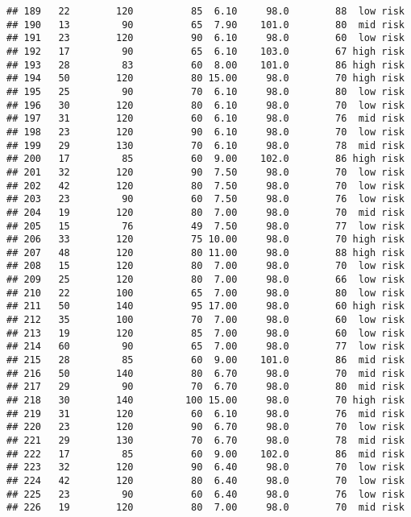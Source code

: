 \documentclass[
  ignorenonframetext,
]{beamer}
\begin{document}
\begin{frame}[fragile]
\begin{verbatim}
## 189   22        120          85  6.10     98.0        88  low risk
## 190   13         90          65  7.90    101.0        80  mid risk
## 191   23        120          90  6.10     98.0        60  low risk
## 192   17         90          65  6.10    103.0        67 high risk
## 193   28         83          60  8.00    101.0        86 high risk
## 194   50        120          80 15.00     98.0        70 high risk
## 195   25         90          70  6.10     98.0        80  low risk
## 196   30        120          80  6.10     98.0        70  low risk
## 197   31        120          60  6.10     98.0        76  mid risk
## 198   23        120          90  6.10     98.0        70  low risk
## 199   29        130          70  6.10     98.0        78  mid risk
## 200   17         85          60  9.00    102.0        86 high risk
## 201   32        120          90  7.50     98.0        70  low risk
## 202   42        120          80  7.50     98.0        70  low risk
## 203   23         90          60  7.50     98.0        76  low risk
## 204   19        120          80  7.00     98.0        70  mid risk
## 205   15         76          49  7.50     98.0        77  low risk
## 206   33        120          75 10.00     98.0        70 high risk
## 207   48        120          80 11.00     98.0        88 high risk
## 208   15        120          80  7.00     98.0        70  low risk
## 209   25        120          80  7.00     98.0        66  low risk
## 210   22        100          65  7.00     98.0        80  low risk
## 211   50        140          95 17.00     98.0        60 high risk
## 212   35        100          70  7.00     98.0        60  low risk
## 213   19        120          85  7.00     98.0        60  low risk
## 214   60         90          65  7.00     98.0        77  low risk
## 215   28         85          60  9.00    101.0        86  mid risk
## 216   50        140          80  6.70     98.0        70  mid risk
## 217   29         90          70  6.70     98.0        80  mid risk
## 218   30        140         100 15.00     98.0        70 high risk
## 219   31        120          60  6.10     98.0        76  mid risk
## 220   23        120          90  6.70     98.0        70  low risk
## 221   29        130          70  6.70     98.0        78  mid risk
## 222   17         85          60  9.00    102.0        86  mid risk
## 223   32        120          90  6.40     98.0        70  low risk
## 224   42        120          80  6.40     98.0        70  low risk
## 225   23         90          60  6.40     98.0        76  low risk
## 226   19        120          80  7.00     98.0        70  mid risk

\end{verbatim}
\end{frame}
\end{document}
